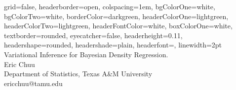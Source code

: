 \documentclass[a0paper,portrait]{baposter}
\begin{document}

\begin{poster}
{
grid=false,
headerborder=open, %
colspacing=1em, %
bgColorOne=white, %
bgColorTwo=white, %
borderColor=darkgreen, %
headerColorOne=lightgreen, %
headerColorTwo=lightgreen, %
headerFontColor=white, %
boxColorOne=white, %
textborder=rounded, %
eyecatcher=false, %
headerheight=0.11\textheight, %
headershape=rounded, %
headershade=plain,
headerfont=\Large\textsf, %
linewidth=2pt %
}
{}
%
%
{
\textsf %
{Variational Inference for Bayesian Density Regression.
}
} %
{\sf\vspace{-0.2em}\\
Eric Chuu
\vspace{0.1em}\\
\small{Department of Statistics, Texas A&M University
\vspace{0.1em}\\
ericchuu@tamu.edu}\\
\vspace{-2cm}
}



\end{poster}
\end{document}
